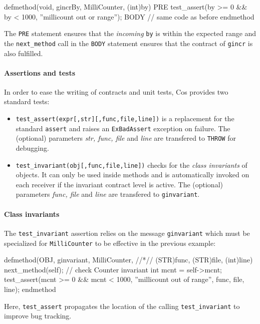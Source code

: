 \documentclass[preprint,10pt]{sigplanconf}
\newcommand{\ProgLang}[1]{{\sc #1}\xspace}
\newcommand{\Cos}       {\ProgLang{Cos}}
\newcommand{\code}[1]{\lstinline[language=COS,style=samplecode]|#1|}
\begin{document}
\vspace{2mm}
\begin{COS}
defmethod(void, gincrBy, MilliCounter, (int)by)
  PRE test_assert(by >= 0 && by < 1000,
                    ''millicount out or range'');
  BODY // same code as before
endmethod
\end{COS}
The \code{PRE} statement ensures that the {\em incoming} \code{by} is within the expected range and the \code{next_method} call in the \code{BODY} statement ensures that the contract of \code{gincr} is also fulfilled.

\paragraph{Assertions and tests}

In order to ease the writing of contracts and unit tests, \Cos provides two standard tests:
\begin{itemize}
\item \code{test_assert(expr[,str][,func,file,line])} is a replacement for the standard \code{assert} and raises an \code{ExBadAssert} exception on failure. The (optional) parameters {\em str, func, file} and {\em line} are transfered to \code{THROW} for debugging.



\item \code{test_invariant(obj[,func,file,line])} checks for the {\em class invariants} of objects. It can only be used inside methods and is automatically invoked on each receiver if the invariant contract level is active. The (optional) parameters {\em func, file} and {\em line} are transfered to \code{ginvariant}.
\end{itemize}



\paragraph{Class invariants}

The \code{test_invariant} assertion relies on the message \code{ginvariant} which must be specialized for \code{MilliCounter} to be effective in the previous example:
\begin{COS}
defmethod(OBJ, ginvariant, MilliCounter, 
//*\hfill*// (STR)func, (STR)file, (int)line)
  next_method(self); // check Counter invariant
  int mcnt = self->mcnt;
  test_assert(mcnt >= 0 && mcnt < 1000,
  ''millicount out of range'', func, file, line);
endmethod
\end{COS}
Here, \code{test_assert} propagates the location of the calling \code{test_invariant} to improve bug tracking. 
\end{document}
